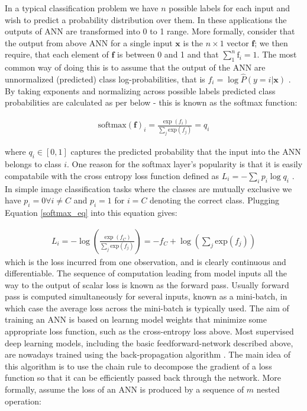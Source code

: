 \documentclass{report}
\begin{document}
In a typical classification problem we have $n$ possible labels for each input and wish to predict a probability distribution over them. In these applications the outputs of ANN are transformed into 0 to 1 range. More formally, consider that the output from above ANN for a single input $\mathbf{x}$ is the $n \times 1$ vector $\mathbf{f}$; we then require, that each element of $\mathbf{f}$ is between 0 and 1 and that $\sum_1^n \text{f}_i = 1$. The most common way of doing this is to assume that the output of the ANN are unnormalized (predicted) class log-probabilities, that is $f_i = \log \hat{P}(y = i | \mathbf{x})$ \cite{Goodfellow2016}. By taking exponents and normalizing across possible labels predicted class probabilities are calculated as per below - this is known as the softmax function:

\begin{align} \label{softmax_eq}
  \text{softmax}(\mathbf{f})_i = \frac{\exp (f_i)}{\sum_j \text{exp}(f_j)}=q_i
\end{align}

where $q_i \in [0,1]$ captures the predicted probability that the input into the ANN belongs to class $i$. One reason for the softmax layer's popularity is that it is easily compatabile with the cross entropy loss function defined as $L_i=-\sum_i p_i \log q_i$ \cite{Shannon1948}. In simple image classification tasks where the classes are mutually exclusive we have $p_i=0 \forall i\ne C$ and $p_i=1$ for $i=C$ denoting the correct class. Plugging Equation \ref{softmax_eq} into this equation gives:

\begin{align} \label{XEloss}
  L_i  = -\log \left(\frac{\exp (f_C)}{\sum_j \text{exp}(f_j)}\right) = -f_C + \log\left(\sum_j \text{exp}(f_j)\right)
\end{align}
which is the loss incurred from one observation, and is clearly continuous and differentiable. The sequence of computation leading from model inputs all the way to the output of scalar loss is known as the forward pass. Usually forward pass is computed simultaneously for several inputs, known as a mini-batch, in which case the average loss across the mini-batch is typically used. 
The aim of training an ANN is based on learnng model weights that minimize some appropriate loss function, such as the cross-entropy loss above. Most supervised deep learning models, including the basic feedforward-network described above, are nowadays trained using the back-propagation algorithm \cite{Linnainmaa1976} \cite{Rumelhart1985}. The main idea of this algorithm is to use the chain rule to decompose the gradient of a loss function so that it can be efficiently passed back through the network. More formally, assume the loss of an ANN is produced by a sequence of $m$ nested operation:
\end{document}
